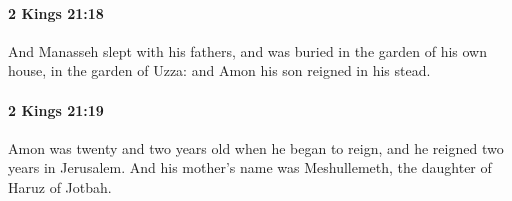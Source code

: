 		\paragraph{2 Kings 21:18} %
			\label{2KINGS-21-18}

			And Manasseh slept with his fathers, and was buried in the garden of his own house, in the garden of Uzza: and Amon his son reigned in his stead.


		\paragraph{2 Kings 21:19} %
			\label{2KINGS-21-19}

			Amon was twenty and two years old when he began to reign, and he reigned two years in Jerusalem. And his mother’s name was Meshullemeth, the daughter of Haruz of Jotbah.


